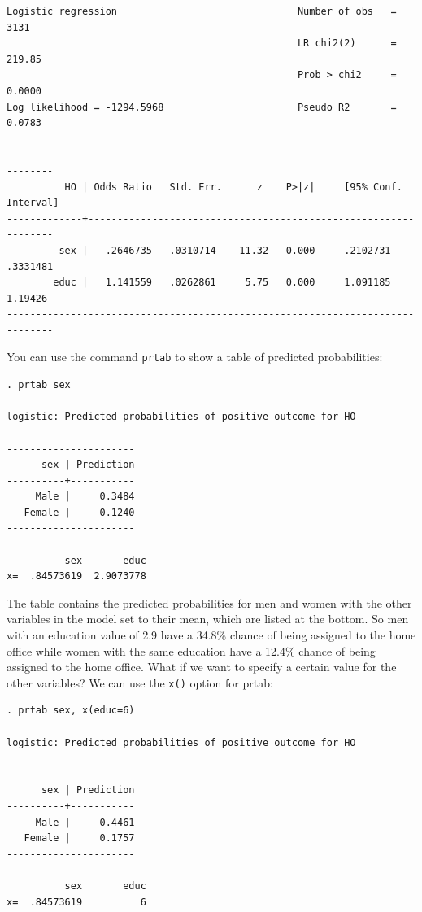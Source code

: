 \documentclass[12pt]{amsart}
\begin{document}
\begin{verbatim}
Logistic regression                               Number of obs   =       3131
                                                  LR chi2(2)      =     219.85
                                                  Prob > chi2     =     0.0000
Log likelihood = -1294.5968                       Pseudo R2       =     0.0783

------------------------------------------------------------------------------
          HO | Odds Ratio   Std. Err.      z    P>|z|     [95% Conf. Interval]
-------------+----------------------------------------------------------------
         sex |   .2646735   .0310714   -11.32   0.000     .2102731    .3331481
        educ |   1.141559   .0262861     5.75   0.000     1.091185     1.19426
------------------------------------------------------------------------------
\end{verbatim}

You can use the command \texttt{prtab} to show a table of predicted probabilities:

\begin{verbatim}
. prtab sex

logistic: Predicted probabilities of positive outcome for HO

----------------------
      sex | Prediction
----------+-----------
     Male |     0.3484
   Female |     0.1240
----------------------

          sex       educ
x=  .84573619  2.9073778
\end{verbatim}

The table contains the predicted probabilities for men and women with the other variables in the model set to their mean, which are listed at the bottom. So men with an education value of 2.9 have a 34.8\% chance of being assigned to the home office while women with the same education have a 12.4\% chance of being assigned to the home office. What if we want to specify a certain value for the other variables? We can use the \texttt{x()} option for prtab:

\begin{verbatim}
. prtab sex, x(educ=6)

logistic: Predicted probabilities of positive outcome for HO

----------------------
      sex | Prediction
----------+-----------
     Male |     0.4461
   Female |     0.1757
----------------------

          sex       educ
x=  .84573619          6
\end{verbatim}
\end{document}
